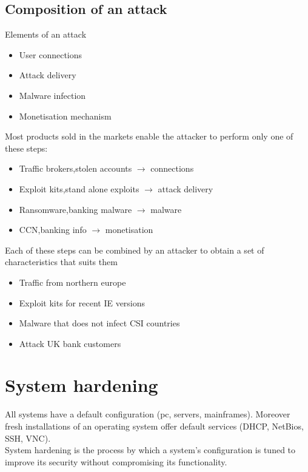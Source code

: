 \documentclass[10pt,a4paper]{book}
\begin{document}
\section{Composition of an attack}
Elements of an attack
\begin{itemize}
\item User connections
\item Attack delivery
\item Malware infection
\item Monetisation mechanism
\end{itemize}
Most products sold in the markets enable the attacker to perform only one of these steps:
\begin{itemize}
\item Traffic brokers,stolen accounts $\to$ connections
\item Exploit kits,stand alone exploits $\to$ attack delivery
\item Ransomware,banking malware $\to$ malware
\item CCN,banking info $\to$ monetisation
\end{itemize}
Each of these steps can be combined by an attacker to obtain a set of characteristics that suits them
\begin{itemize}
\item Traffic from northern europe
\item Exploit kits for recent IE versions
\item Malware that does not infect CSI countries
\item Attack UK bank customers
\end{itemize}
\chapter{System hardening}
All systems have a default configuration (pc, servers, mainframes). Moreover fresh installations of an operating system offer default services (DHCP, NetBios, SSH, VNC).\\
System hardening is the process by which a system's configuration is tuned to improve its security without compromising its functionality.
\end{document}
